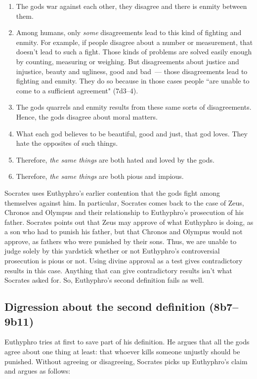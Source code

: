 \documentclass[11pt]{article}
\begin{document}
\begin{enumerate}
    \item The gods war against each other, they disagree and there is enmity between them.
    \item Among humans, only \emph{some} disagreements lead to this kind of fighting and enmity.  For example, if people disagree about a number or measurement, that doesn't lead to such a fight.  Those kinds of problems are solved easily enough by counting, measuring or weighing.  But disagreements about justice and injustice, beauty and ugliness, good and bad~--- those disagreements lead to fighting and enmity.  They do so because in those cases people ``are unable to come to a sufficient agreement" (7d3--4).
    \item The gods quarrels and enmity results from these same sorts of disagreements.  Hence, the gods disagree about moral matters.
    \item What each god believes to be beautiful, good and just, that god loves.  They hate the opposites of such things.
    \item Therefore, \emph{the same things} are both hated and loved by the gods.
    \item Therefore, \emph{the same things} are both pious and impious.  \end{enumerate}

Socrates uses Euthyphro's earlier contention that the gods fight among themselves against him.  In particular, Socrates comes back to the case of Zeus, Chronos and Olympus and their relationship to Euthyphro's prosecution of his father.  Socrates points out that Zeus may approve of what Euthyphro is doing, as a son who had to punish his father, but that Chronos and Olympus would not approve, as fathers who were punished by their sons.  Thus, we are unable to judge solely by this yardstick whether or not Euthyphro's controversial prosecution is pious or not.  Using divine approval as a test gives contradictory results in this case.  Anything that can give contradictory results isn't what Socrates asked for.  So, Euthyphro's second definition fails as well.

\subsection{Digression about the second definition (8b7--9b11)}

Euthyphro tries at first to save part of his definition.  He argues that all the gods agree about one thing at least: that whoever kills someone unjustly should be punished.  Without agreeing or disagreeing, Socrates picks up Euthyphro's claim and argues as follows:
\end{document}
